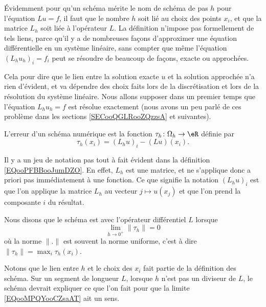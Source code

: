 \begin{normaltext}
Évidemment pour qu'un schéma mérite le nom de schéma de pas \( h\) pour l'équation \( Lu=f\), il faut que le nombre \( h\) soit lié au choix des points \( x_i\), et que la matrice \( L_h\) soit liée à l'opérateur \( L\). La définition n'impose pas formellement de tels liens, parce qu'il y a de nombreuses façons d'approximer une équation différentielle en un système linéaire, sans compter que même l'équation \( (L_hu_h)_i=f_i\) peut se résoudre de beaucoup de façons, exacte ou approchées.
    
Cela pour dire que le lien entre la solution exacte \( u\) et la solution approchée n'a rien d'évident, et va dépendre des choix faits lors de la discrétisation et lors de la résolution du système linéaire. Nous allons supposer dans un premier temps que l'équation \( L_hu_h=f\) est résolue exactement (nous avons un peu parlé de ces problème dans les sections \ref{SECooQGLRooZQzzsA} et suivantes).
\end{normaltext}

\begin{definition}
    L'erreur  d'un schéma numérique est la fonction \( \tau_h\colon \Omega_h\to \eR\) définie par
    \begin{equation}        \label{EQooPFBBooJumDZO}
        \tau_h(x_i)=(L_hu)_i-(Lu)(x_i).
    \end{equation}
\end{definition}
Il y a un jeu de notation pas tout à fait évident dans la définition \eqref{EQooPFBBooJumDZO}. En effet, \( L_h\) est une matrice, et ne s'applique donc a priori pas immédiatement à une fonction. Ce que signifie la notation \( (L_hu)_i\) est que l'on applique la matrice \( L_h\) au vecteur \( j\mapsto u(x_j)\) et que l'on prend la composante \( i\) du résultat.

\begin{definition}
    Nous disons que le schéma est  avec l'opérateur différentiel \( L\) lorsque
    \begin{equation}        \label{EQooMPQYooCZsaAT}
        \lim_{h\to 0^+} \| \tau_h \|=0
    \end{equation}
    où la norme \( \| . \|\) est souvent la norme uniforme, c'est à dire \( \| \tau_h \|=\max_i\tau_h(x_i)\).
\end{definition}

Notons que le lien entre \( h\) et le choix des \( x_i\) fait partie de la définition des schéma. Sur un segment de longueur \( L\), lorsque \( h\) n'est pas un diviseur de \( L\), le schéma devrait expliquer ce que l'on fait pour que la limite \eqref{EQooMPQYooCZsaAT} ait un sens.


